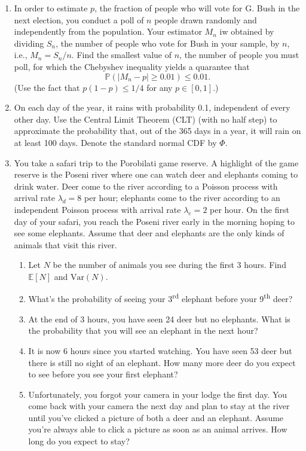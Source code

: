 \documentclass[a4paper,9pt,landscape]{extarticle}
\newcommand{\var}{\textrm{Var}}
\begin{document}
\begin{multicols*}{3}
\begin{enumerate}
	\item In order to estimate $p$, the fraction of people who will vote for G. Bush in the next election, you conduct a poll of $n$ people drawn randomly and independently from the population. Your estimator $M_n$ iw obtained by dividing $S_n$, the number of people who vote for Bush in your sample, by $n$, i.e., $M_n=S_n/n$. Find the smallest value of $n$, the number of people you must poll, for which the Chebyshev inequality yields a quarantee that
	$$\mathds{P}\left(\left|M_n-p\right|\geq0.01\right)\leq0.01.$$
	(Use the fact that $p(1-p)\leq1/4$ for any $p\in[0,1]$.)
	\item On each day of the year, it rains with probability 0.1, independent of every other day. Use the Central Limit Theorem (CLT) (with no half step) to approximate the probability that, out of the 365 days in a year, it will rain on at least 100 days. Denote the standard normal CDF by $\Phi$.
	\item You take a safari trip to the Porobilati game reserve. A highlight of the game reserve is the Poseni river where one can watch deer and elephants coming to drink water. Deer come to the river according to a Poisson process with arrival rate $\lambda_d=8$ per hour; elephants come to the river according to an independent Poisson process with arrival rate $\lambda_e=2$ per hour. On the first day of your safari, you reach the Poseni river early in the morning hoping to see some elephants. Assume that deer and elephants are the only kinds of animals that visit this river.
	\begin{enumerate}
		\item Let $N$ be the number of animals you see during the first 3 hours. Find $\mathds{E}[N]$ and $\var(N)$.
		\item What's the probability of seeing your 3\textsuperscript{rd} elephant before your 9\textsuperscript{th} deer?
		\item At the end of 3 hours, you have seen 24 deer but no elephants. What is the probability that you will see an elephant in the next hour?
		\item It is now 6 hours since you started watching. You have seen 53 deer but there is still no sight of an elephant. How many more deer do you expect to see before you see your first elephant?
		\item Unfortunately, you forgot your camera in your lodge the first day. You come back with your camera the next day and plan to stay at the river until you've clicked a picture of both a deer and an elephant. Assume you're always able to click a picture as soon as an animal arrives. How long do you expect to stay?

\end{enumerate}
\end{enumerate}
\end{multicols*}
\end{document}
